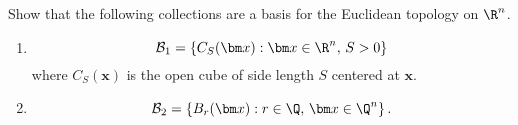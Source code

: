 \begin{problem}
	Show that the following collections are a basis for the Euclidean topology
	on $\R^n$.
	\begin{enumerate}
		\item 
			\[
				\mathcal B_1 = \left\{
					C_S(\bm x) : \bm x \in \R^n, \, S > 0 
				\right\}
			\]
			where $C_S(\bm x)$ is the open cube of side length $S$ centered at
			$\bm x$.

		\item 
			\[
				\mathcal B_2 = \left\{ 
					B_r(\bm x): r \in \Q, \, \bm x \in \Q^n 
				\right\}.
			\]
	\end{enumerate}
\end{problem}

